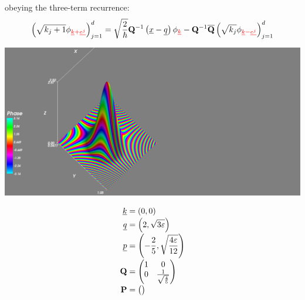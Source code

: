 \documentclass[b0paper,portrait,fontscale=0.24]{baposter}
\newenvironment{shrinkeq}[1]
{ \bgroup
  \addtolength\abovedisplayshortskip{#1}
  \addtolength\abovedisplayskip{#1}
  \addtolength\belowdisplayshortskip{#1}
  \addtolength\belowdisplayskip{#1}}
{\egroup\ignorespacesafterend}
\newcommand{\white}[1]{\textcolor{white}{#1}}
\newcommand{\alert}[1]{\textcolor{red}{#1}}
\begin{document}
\begin{poster}
{\begin{minipage}[c]{\linewidth}
      obeying the three-term recurrence:
      \begin{shrinkeq}{-1ex}
        \begin{equation*}
          \left(\sqrt{k_{j}+1}\phi_{\alert{\vec{k}+\vec{e^j}}}\right)_{j=1}^{d}
          = \sqrt{\frac{2}{\hbar}} \mat{Q}\inv \left(\vec{x}-\vec{q}\right) \phi_{\alert{\vec{k}}} -
          \mat{Q}\inv \conj{\mat{Q}} \left(\sqrt{k_{j}} \phi_{\alert{\vec{k}-\vec{e^j}}}\right)_{j=1}^{d}
        \end{equation*}
      \end{shrinkeq}
    \end{minipage}
    \begin{minipage}[c]{0.5\linewidth}
      \begin{minipage}[c]{\linewidth}
        \includegraphics[width=\textwidth]{plot1}
      \end{minipage}
      \hspace*{-0.45\textwidth}
      \begin{minipage}[c]{0.40\textwidth}
        \vspace{1mm}
        { \smaller\white {\smaller
            \begin{align*}
              \vec{k} & = (0,0) \\[-2.5pt]
              \vec{q} & = \left(2, \sqrt{3\varepsilon}\right) \\[-2.5pt]
              \vec{p} & = \left(-\frac{2}{5}, \sqrt{\frac{4\varepsilon}{12}}\right) \\[-2.5pt]
              \mat{Q} & =
              \begin{pmatrix}
                1 & 0\\
                0 & \frac{1}{\sqrt{\frac{4}{5}}}
              \end{pmatrix} \\[-2.5pt]
              \mat{P} & =
              \begin{pmatrix}\smaller

\end{pmatrix}
\end{align*}}}
\end{minipage}
\end{minipage}}
\end{poster}
\end{document}

